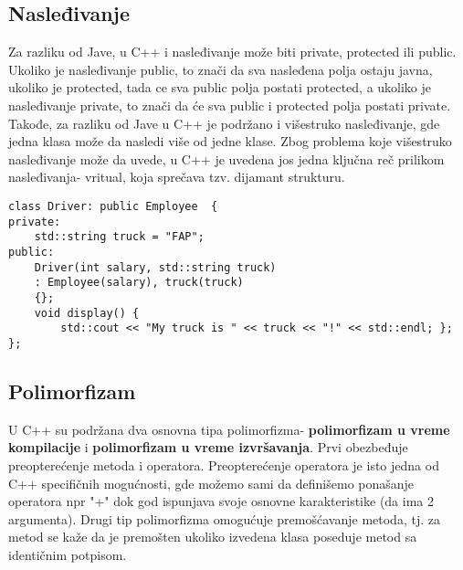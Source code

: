\documentclass[a4paper]{article}
\begin{document}
\subsection{Nasleđivanje}
\label{subsec:c++Nasledjivanje}
Za razliku od Jave, u C++ i nasleđivanje može biti private, protected ili public. Ukoliko je nasleđivanje public, to znači da sva nasleđena polja ostaju javna, ukoliko je protected, tada ce sva public polja postati protected, a ukoliko je nasleđivanje private, to znači da će sva public i protected polja postati private. Takođe, za razliku od Jave u C++ je podržano i višestruko nasleđivanje, gde jedna klasa može da nasledi više od jedne klase. Zbog problema koje višestruko nasleđivanje može da uvede, u C++ je uvedena jos jedna ključna reč prilikom nasleđivanja- vritual, koja sprečava tzv. dijamant strukturu. 
\begin{lstlisting}[caption={Primer nasleđivanja klasa u C++},frame=single, label=lst:c++Nasledjivanje]
class Driver: public Employee  {
private:
  	std::string truck = "FAP";
public: 
   	Driver(int salary, std::string truck) 
	: Employee(salary), truck(truck) 
	{};
  	void display() {
		std::cout << "My truck is " << truck << "!" << std::endl; };
};
\end{lstlisting}
\subsection{Polimorfizam}
\label{subsec:c++Polimorfizam}
U C++ su podržana dva osnovna tipa polimorfizma- \textbf{polimorfizam u vreme kompilacije} i \textbf{polimorfizam u vreme izvršavanja}. Prvi obezbeđuje preopterećenje metoda i operatora. Preopterećenje operatora je isto jedna od C++ specifičnih mogućnosti, gde možemo sami da definišemo ponašanje operatora npr "+" dok god ispunjava svoje osnovne karakteristike (da ima 2 argumenta). Drugi tip polimorfizma omogućuje premošćavanje metoda, tj. za metod se kaže da je premošten ukoliko izvedena klasa poseduje metod sa identičnim potpisom. 
\end{document}
